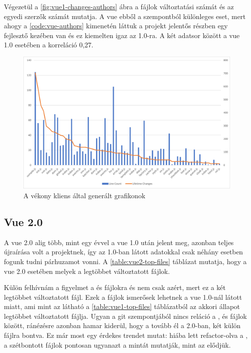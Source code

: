 Végezetül a \ref{fig:vue1-changes-authors} ábra a fájlok változtatási számát és az egyedi szerzők számát mutatja. A vue ebből a szempontból különleges eset, mert ahogy a \ref{code:vue-authors} kimenetén láttuk a projekt jelentős részben egy fejlesztő kezében van és ez kiemelten igaz az 1.0-ra. A két adatsor között a vue 1.0 esetében a korreláció 0,27.

\begin{figure}[H]
    \centering
    \includegraphics[width=1\textwidth]{images/vue/vue1-lines-lifetimechanges.png}
    \caption{A vékony kliens által generált grafikonok}
    \label{fig:vue1-changes-lines}
\end{figure}

\pagebreak

\subsection{Vue 2.0}

A vue 2.0 alig több, mint egy évvel a vue 1.0 után jelent meg, azonban teljes újraírása volt a projektnek, így az 1.0-ban látott adatokkal csak néhány esetben fogunk tudni párhuzamot vonni. A \ref{table:vue2-top-files} táblázat mutatja, hogy a vue 2.0 esetében melyek a legtöbbet változtatott fájlok.

Külön felhívnám a figyelmet a  és  fájlokra és nem csak azért, mert ez a két legtöbbet változtatott fájl. Ezek a fájlok ismerősek lehetnek a vue 1.0-nál látott  miatt, ami mint az látható a \ref{table:vue1-top-files} táblázatból az akkori állapot legtöbbet változtatott fájlja. Ugyan a git szempontjából nincs reláció a ,  és  fájlok között, ránézésre azonban hamar kiderül, hogy a  tovább él a 2.0-ban, két külön fájlra bontva. Ez már most egy érdekes trendet mutat: hiába lett refactor-olva a , a szétbontott fájlok pontosan ugyanazt a mintát mutatják, mint az elődjük.


